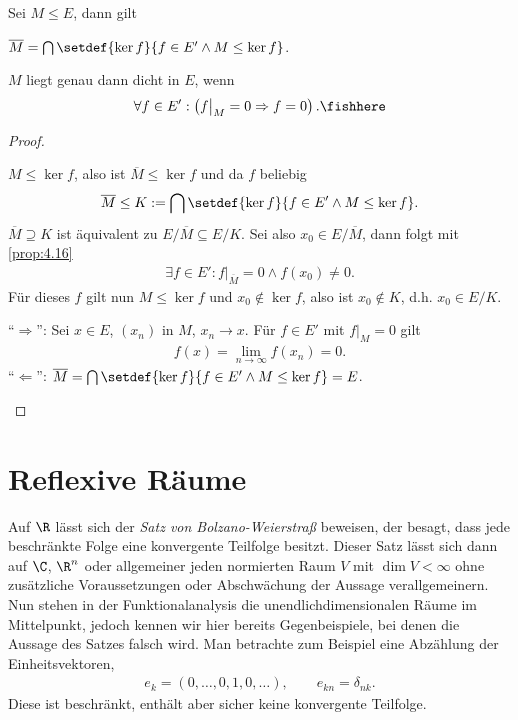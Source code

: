 \begin{cor}
\label{prop:4.17}
Sei $M\le E$, dann gilt
\begin{propenum}
  \item $\overline{M}=\bigcap \setdef{\ker f}{f\in E'\land M\le \ker f}$.
  \item $M$ liegt genau dann dicht in $E$, wenn
\begin{align*}
\forall f\in E' : \left(f\big|_M=0\Rightarrow f=0\right).\fishhere
\end{align*}
\end{propenum}
\end{cor}
\begin{proof}
\begin{proofenum}
  \item $M\le \ker f$, also ist $\overline{M}\le \ker f$ und da $f$ beliebig
\begin{align*}
\overline{M}\le K:=\bigcap \setdef{\ker f}{f\in E'\land M\le \ker f}.
\end{align*}
$\overline{M}\supseteq K$ ist äquivalent zu $E/\overline{M}\subseteq E/K$. Sei
also $x_0\in E/\overline{M}$, dann folgt mit \ref{prop:4.16}
\begin{align*}
\exists f\in E' : f\big|_{\overline{M}}  = 0\land f(x_0)\neq 0.
\end{align*}
Für dieses $f$ gilt nun $M\le\ker f$ und $x_0\notin \ker f$, also ist
$x_0\notin K$, d.h. $x_0\in E/K$.
\item ``$\Rightarrow$'': Sei $x\in E$, $(x_n)$ in $M$, $x_n\to x$. Für $f\in
E'$ mit $f\big|_M=0$ gilt
\begin{align*}
f(x) = \lim\limits_{n\to\infty} f(x_n) = 0.
\end{align*}
``$\Leftarrow$'': $\overline{M}=\bigcap \setdef{\ker f}{f\in E'\land M\le \ker
f}=E$.\qedhere
\end{proofenum}
\end{proof}

\section{Reflexive Räume}

Auf $\R$ lässt sich der \textit{Satz von Bolzano-Weierstraß} beweisen, der
besagt, dass jede beschränkte Folge eine konvergente Teilfolge besitzt. Dieser
Satz lässt sich dann auf $\C$, $\R^n$ oder allgemeiner jeden
normierten Raum $V$ mit $\dim V < \infty$ ohne zusätzliche Voraussetzungen oder
Abschwächung der Aussage verallgemeinern. Nun stehen in der Funktionalanalysis
die unendlichdimensionalen Räume im Mittelpunkt, jedoch kennen wir hier
bereits Gegenbeispiele, bei denen die Aussage des Satzes falsch wird. Man
betrachte zum Beispiel eine Abzählung der Einheitsvektoren,
\begin{align*}
e_k = (0,\ldots,0,1,0,\ldots),\qquad e_{kn} = \delta_{nk}.
\end{align*}
Diese ist beschränkt, enthält aber sicher keine konvergente Teilfolge.

